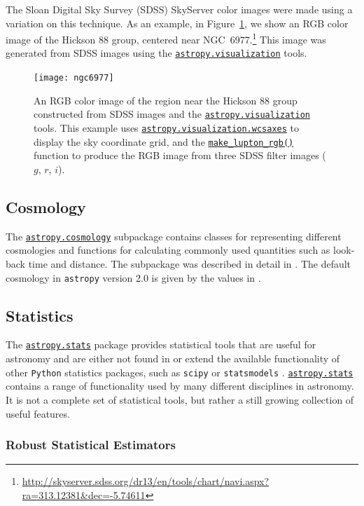 \documentclass[modern]{aastex62}
\newcommand{\package}[1]{\texttt{#1}\xspace}
\newcommand{\python}{\package{Python}}
\newcommand{\astropypkg}{\package{astropy}}
\renewcommand{\figurename}{Figure\xspace}
\newcommand{\astropysubpkg}[1]{\href{http://docs.astropy.org/en/stable/#1/index.html}{\texttt{astropy.#1}}\xspace}
\newcommand{\astropywcsaxes}{\href{http://docs.astropy.org/en/stable/visualization/wcsaxes/index.html}{\texttt{astropy.visualization.wcsaxes}}\xspace}
\begin{document}
The Sloan Digital Sky Survey (SDSS) SkyServer color images were made using a
variation on this technique.  As an example, in \figurename~\ref{fig:ngc6977},
we show an RGB color image of the Hickson 88 group, centered near
NGC~6977.\footnote{\url{http://skyserver.sdss.org/dr13/en/tools/chart/navi.aspx?ra=313.12381&dec=-5.74611}}
This image was generated from SDSS images using the
\astropysubpkg{visualization} tools.

\begin{figure}
\texttt{[image: ngc6977]}
\caption{An RGB color image of the region near the Hickson 88 group
constructed from SDSS images and the \astropysubpkg{visualization}
tools.
This example uses \astropywcsaxes to display the
sky coordinate grid, and the
\href{http://docs.astropy.org/en/stable/api/astropy.visualization.make_lupton_rgb.html}{\texttt{make\_lupton\_rgb()}}
function to produce the RGB image from three SDSS filter images ($g$, $r$, $i$).
\label{fig:ngc6977}}
\end{figure}


\subsection{Cosmology}

The \astropysubpkg{cosmology} subpackage contains classes for representing
different cosmologies and functions for calculating commonly used quantities
such as look-back time and distance.   The subpackage was described in detail in
\cite{astropy}.  The default cosmology in \astropypkg version 2.0 is given by
the values in \cite{2016A&A...594A..13P}.

\subsection{Statistics}

The \astropysubpkg{stats} package provides statistical tools that
are useful for astronomy and are either not found in or extend
the available functionality of other \python statistics packages, such
as \package{scipy} \citep{scipy} or \package{statsmodels}
\citep{seabold2010statsmodels}.  \astropysubpkg{stats} contains
a range of functionality used by many different disciplines
in astronomy. It is not a complete set of statistical tools, but rather
a still growing collection of useful features.


\subsubsection{Robust Statistical Estimators}
\end{document}
